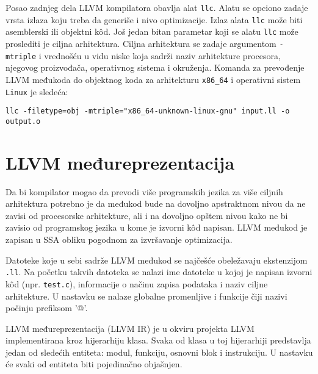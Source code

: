 \documentclass[12pt,oneside]{memoir}
\begin{document}
Posao zadnjeg dela LLVM kompilatora obavlja alat \texttt{llc}. Alatu se opciono zadaje
vrsta izlaza koju treba da generiše i nivo optimizacije. Izlaz alata \texttt{llc} može biti asemblerski ili objektni k\^od. Još jedan bitan parametar koji se alatu \texttt{llc} može proslediti je ciljna arhitektura. Ciljna arhitektura se zadaje argumentom \texttt{-mtriple} i vrednošću u vidu niske koja sadrži naziv arhitekture procesora, njegovog proizvođača, operativnog sistema i okruženja. Komanda za prevođenje LLVM međukoda do objektnog koda za
arhitekturu \texttt{x86\_64} i operativni sistem \texttt{Linux} je sledeća:

\begin{verbatim}
llc -filetype=obj -mtriple="x86_64-unknown-linux-gnu" input.ll -o output.o 
\end{verbatim}

\section{LLVM međureprezentacija}
\label{sec:llvm_ir}

Da bi kompilator mogao da prevodi više programskih jezika za više ciljnih arhitektura potrebno je da međukod bude na dovoljno apstraktnom nivou da ne zavisi od procesorske arhitekture, ali i na dovoljno opštem nivou kako ne bi zavisio od programskog jezika u kome je izvorni k\^od napisan. LLVM međukod je zapisan u SSA obliku 
pogodnom za izvršavanje optimizacija.

Datoteke koje u sebi sadrže LLVM međukod se najčešće obeležavaju ekstenzijom \texttt{.ll}. Na početku takvih datoteka se nalazi ime datoteke u kojoj je napisan izvorni kôd (npr. \texttt{test.c}), informacije o načinu zapisa podataka i naziv ciljne arhitekture. U nastavku se nalaze globalne promenljive i funkcije čiji nazivi počinju prefiksom ’@’.

LLVM međureprezentacija (LLVM IR) je u okviru projekta LLVM implementirana kroz hijerarhiju klasa. Svaka od klasa u toj hijerarhiji predstavlja jedan od sledećih entiteta: modul, funkciju, osnovni blok i instrukciju. U nastavku će svaki od entiteta biti pojedinačno objašnjen.
\end{document}
